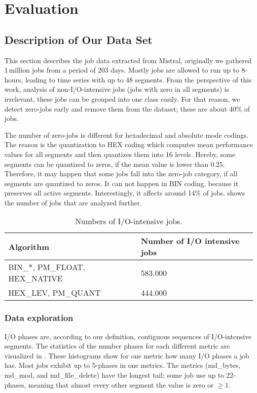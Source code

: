 \documentclass{jhps}
\begin{document}
\section{Evaluation}

\subsection{Description of Our Data Set}

This section describes the job data extracted from Mistral, originally we gathered 1\,million jobs from a period of 203 days.
Mostly jobs are allowed to run up to 8-hours, leading to time series with up to 48 segments.
From the perspective of this work, analysis of non-I/O-intensive jobs (jobs with zero in all segments) is irrelevant, these jobs can be grouped into one class easily.
For that reason, we detect zero-jobs early and remove them from the dataset; these are about 40\% of jobs.

The number of zero-jobs is different for hexadecimal and absolute mode codings.
The reason is the quantization to HEX coding which computes mean performance values for all segments and then quantizes them into 16 levels.
Hereby, some segments can be quantized to zeros, if the mean value is lower than 0.25.
Therefore, it may happen that some jobs fall into the zero-job category, if all segments are quantized to zeros.
It can not happen in BIN coding, because it preserves all active segments.
Interestingly, it affects around 14$\%$ of jobs.
 shows the number of jobs that are analyzed further.

\begin{table}
  \centering
  \begin{tabular}{ll}
    Algorithm & Number of I/O intensive jobs \\
    \hline
    BIN\_$\ast$, PM\_FLOAT, HEX\_NATIVE &  583.000 \\
    HEX\_LEV, PM\_QUANT &  444.000 \\
  \end{tabular}
  \caption{Numbers of I/O-intensive jobs.}
  \label{tab:n_intensive_jobs}
\end{table}


\subsubsection{Data exploration}
I/O phases are, according to our definition, contiguous sequences of I/O-intensive segments.
The statistics of the number phases for each different metric are visualized in .
These histograms show for one metric how many I/O phases a job has.
Most jobs exhibit up to 5-phases in one metrics.
The metrics (md\_bytes, md\_mod, and md\_file\_delete) have the longest tail; some job use up to 22-phases, meaning that almost every other segment the value is zero or $\geq 1$.
\end{document}
